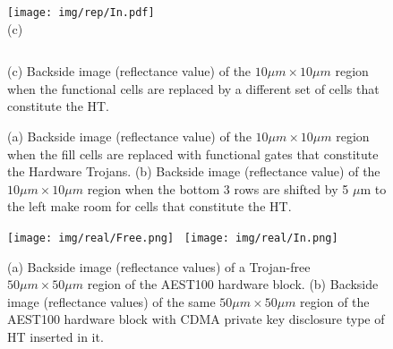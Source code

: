 \documentclass{beamer}
\begin{document}
\begin{columns}
\begin{column}[T]{0.33\textwidth}
\begin{figure}[t]
\begin{columns}
                    \end{columns}
                    \begin{columns}
                    \begin{center}
                        \texttt{[image: img/rep/In.pdf]}\\
                        (c)
                    \end{center}
                        \caption{
                         (a) Backside image (reflectance value) of the $10\mu m
                        \times 10\mu m$ region when the fill cells are replaced
                        with functional gates that constitute the Hardware
                        Trojans.  (b) Backside image (reflectance value) of the
                        $10\mu m \times 10\mu m$ region when the bottom 3 rows
                        are shifted by 5 $\mu$m to the left make room for cells
                        that constitute the HT.  }
                    \end{columns}
                        \justify
                        (c) Backside image (reflectance
                        value) of the $10\mu m \times 10\mu m$ region when the
                        functional cells are replaced by a different set of
                        cells that constitute the HT.
                \end{figure} 

                \begin{figure}[h]
                     \centering
                         \texttt{[image: img/real/Free.png]}~
                         \texttt{[image: img/real/In.png]}
                     \caption{
                         (a) Backside image (reflectance values) of a Trojan-free $50\mu m \times 50\mu
                         m$ region of the AEST100 hardware block.
                         (b) Backside image (reflectance values) of the same $50\mu m \times 50\mu
                         m$ region of the AEST100 hardware block with {\color{black}CDMA private
                         key disclosure} type of HT inserted in it.}
                     \label{imaging_result}
                 \end{figure}


\end{column}
\end{columns}
\end{document}

